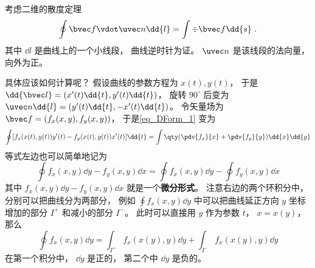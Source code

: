 
\begin{issues}
\issueDraft
{}
\end{issues}


考虑二维的散度定理
\begin{equation}\label{eq_DForm_1}
\oint \bvec f \vdot \uvec n \dd{l} = \int \div \bvec f \dd{s}~.
\end{equation}
其中 $\dd{l}$ 是曲线上的一个小线段， 曲线逆时针为证。 $\uvec n$ 是该线段的法向量， 向外为正。

具体应该如何计算呢？ 假设曲线的参数方程为 $x(t), y(t)$， 于是 $\dd{\bvec l} = (x'(t)\dd{t}, y'(t)\dd{t})$， 旋转 $90^\circ$ 后变为 $\uvec n \dd{l} = (y'(t)\dd{t}, -x'(t)\dd{t})$。 令矢量场为 $\bvec f = (f_x(x,y), f_y(x,y))$， 于是\autoref{eq_DForm_1} 变为
\begin{equation}
\oint [f_x(x(t),y(t)) y'(t) - f_y(x(t),y(t)) x'(t)]\dd{t}
= \int \qty(\pdv{f_x}{x} + \pdv{f_y}{y}) \dd{x}\dd{y}
\end{equation}
等式左边也可以简单地记为
\begin{equation}
\oint f_x(x,y) \dd{y} - f_y(x,y) \dd{x} = \oint f_x(x,y) \dd{y} - \oint f_y(x,y) \dd{x}
\end{equation}
其中 $f_x(x,y) \dd{y} - f_y(x,y) \dd{x}$ 就是一个\textbf{微分形式}。 注意右边的两个环积分中， 分别可以把曲线分为两部分， 例如 $\oint f_x(x,y) \dd{y}$ 中可以把曲线延正方向 $y$ 坐标增加的部分 $I^+$ 和减小的部分 $I^-$。 此时可以直接用 $y$ 作为参数 $t$， $x = x(y)$， 那么
\begin{equation}
\oint f_x(x,y) \dd{y} = \int_{I^+} f_x(x(y),y) \dd{y} + \int_{I^-} f_x(x(y),y) \dd{y}
\end{equation}
在第一个积分中， $\dd{y}$ 是正的， 第二个中 $\dd{y}$ 是负的。

